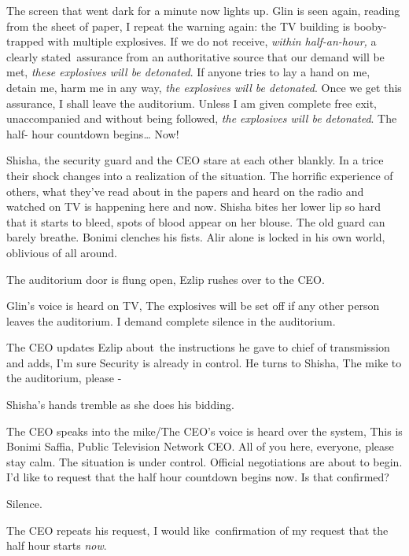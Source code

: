 \documentclass[12pt]{book}
\begin{document}
The screen that went dark for a minute now lights up. Glin is seen again, reading from the sheet of paper,
{\textquotedbl}I repeat the warning again: the TV building is booby-trapped with multiple explosives. If we do not
receive, \textit{within half-an-hour,} a clearly stated~assurance from an authoritative source that our demand will be
met, \textit{these explosives will be detonated}. If anyone tries to lay a hand on me, detain me, harm me in any way,
\textit{the explosives will be detonated}. Once we get this assurance, I shall leave the auditorium. Unless I am given
complete free exit, unaccompanied and without{ }being followed, \textit{the
explosives will be detonated}. The half- hour countdown begins{\dots} Now!{\textquotedbl}

Shisha, the security guard and the CEO stare at each other{ }blankly. In a trice
their shock changes into a realization of the situation. The horrific experience of others, what they've read about in
the papers and heard on the radio and watched on TV is happening here and now. Shisha bites her lower lip so hard that
it starts to bleed, spots of blood appear{ }on her blouse. The old guard can
barely breathe. Bonimi clenches his fists. Alir alone is locked in his own world, oblivious of all around.

The auditorium door is flung open, Ezlip rushes over to the CEO.

Glin's voice is heard on TV, {\textquotedbl}The explosives will be set off if any other person leaves the auditorium. I
demand complete silence in the auditorium.{\textquotedbl}

The CEO updates Ezlip about~the instructions he gave to chief of transmission and adds, {\textquotedbl}I'm sure Security
is already in control.{\textquotedbl} He turns to Shisha, {\textquotedbl}The mike to the auditorium, please
-{\textquotedbl}

Shisha's hands tremble as she does his bidding.

The CEO speaks into the mike/{The CEO's voice is heard over the system},
{\textquotedbl}This is Bonimi Saffia, Public Television Network CEO. All of you here, everyone, please stay calm. The
situation is under control. Official negotiations are about to{ }begin. I'd
like to request that the half hour{ }countdown{ }begins now. Is that
confirmed?{\textquotedbl}

Silence.

The CEO repeats his request, {\textquotedbl}I would like~confirmation of my request that the half hour starts
\textit{now}.{\textquotedbl}
\end{document}
